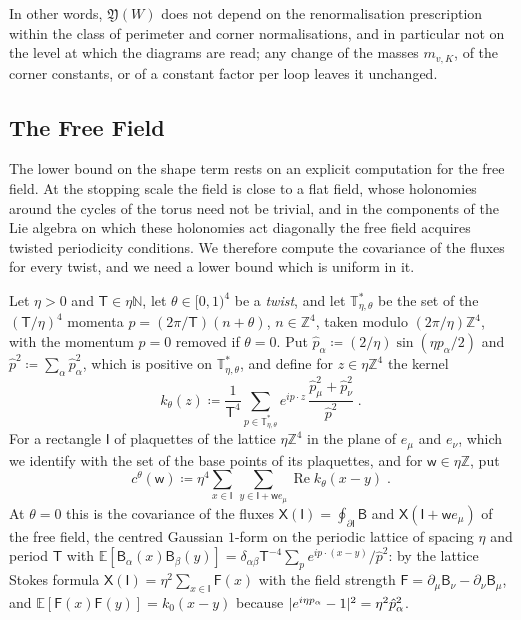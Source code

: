 \documentclass[11pt]{preprint}
\DeclarePairedDelimiter{\abs}{\lvert}{\rvert}
\numberwithin{equation}{section}
\theoremstyle{definition}
\theoremstyle{remark}
\theoremstyle{plain}
\begin{document}
In other words, $\mathfrak Y(W)$ does not depend on the renormalisation prescription within the class of perimeter and corner normalisations, and in particular not on the level at which the diagrams are read; any change of the masses $m_{v,K}$, of the corner constants, or of a constant factor per loop leaves it unchanged.

\subsection{The Free Field}\label{sec:free-field}

The lower bound on the shape term rests on an explicit computation for the free field. At the stopping scale the field is close to a flat field, whose holonomies around the cycles of the torus need not be trivial, and in the components of the Lie algebra on which these holonomies act diagonally the free field acquires twisted periodicity conditions. We therefore compute the covariance of the fluxes for every twist, and we need a lower bound which is uniform in it.

Let $\eta > 0$ and $\mathsf T \in \eta\mathbb N$, let $\theta \in [0, 1)^4$ be a \emph{twist}, and let $\mathbb T^*_{\eta,\theta}$ be the set of the $(\mathsf T/\eta)^4$ momenta $p = (2\pi/\mathsf T)(n + \theta)$, $n \in \mathbb Z^4$, taken modulo $(2\pi/\eta)\mathbb Z^4$, with the momentum $p = 0$ removed if $\theta = 0$. Put $\hat p_\alpha \coloneqq (2/\eta)\sin(\eta p_\alpha/2)$ and $\hat p^2 \coloneqq \sum_\alpha\hat p_\alpha^2$, which is positive on $\mathbb T^*_{\eta,\theta}$, and define for $z \in \eta\mathbb Z^4$ the kernel
\begin{equation}\label{eq:flux-kernel}
    k_\theta(z) \coloneqq \frac{1}{\mathsf T^4}\sum_{p \in \mathbb T^*_{\eta,\theta}}e^{ip\cdot z}\,\frac{\hat p_\mu^2 + \hat p_\nu^2}{\hat p^2}\;.
\end{equation}
For a rectangle $\mathsf I$ of plaquettes of the lattice $\eta\mathbb Z^4$ in the plane of $e_\mu$ and $e_\nu$, which we identify with the set of the base points of its plaquettes, and for $\mathsf w \in \eta\mathbb Z$, put
\begin{equation}\label{eq:flux-covariance}
    c^\theta(\mathsf w) \coloneqq \eta^4\sum_{x \in \mathsf I}\,\sum_{y \in \mathsf I + \mathsf we_\mu}\operatorname{Re}k_\theta(x - y)\;.
\end{equation}
At $\theta = 0$ this is the covariance of the fluxes $\mathsf X(\mathsf I) = \oint_{\partial\mathsf I}\mathsf B$ and $\mathsf X(\mathsf I + \mathsf we_\mu)$ of the free field, the centred Gaussian $1$-form on the periodic lattice of spacing $\eta$ and period $\mathsf T$ with $\mathbb E[\mathsf B_\alpha(x)\mathsf B_\beta(y)] = \delta_{\alpha\beta}\mathsf T^{-4}\sum_{p}e^{ip\cdot(x-y)}/\hat p^2$: by the lattice Stokes formula $\mathsf X(\mathsf I) = \eta^2\sum_{x \in \mathsf I}\mathsf F(x)$ with the field strength $\mathsf F = \partial_\mu\mathsf B_\nu - \partial_\nu\mathsf B_\mu$, and $\mathbb E[\mathsf F(x)\mathsf F(y)] = k_0(x - y)$ because $\abs{e^{i\eta p_\alpha} - 1}^2 = \eta^2\hat p_\alpha^2$.
\end{document}
